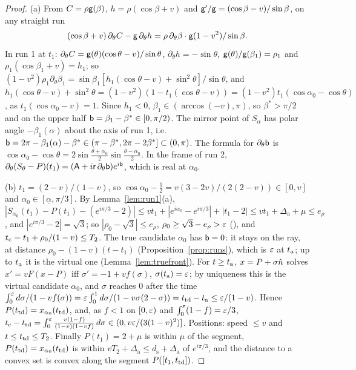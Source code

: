 \begin{proof}
(a) From $C=\rho\mathsf g(\beta)$, $h=\rho(\cos\beta+v)$ and $\mathsf g'/\mathsf g=(\cos\beta-v)/\sin\beta$, on any straight run
\[
(\cos\beta+v)\,\partial_\theta C-\mathsf g\,\partial_\theta h=\rho\,\partial_\theta\beta\cdot\mathsf g(1-v^2)/\sin\beta .
\]
In run 1 at $t_1$: $\partial_\theta C=\mathsf g(\theta)(\cos\theta-v)/\sin\theta$, $\partial_\theta h=-\sin\theta$, $\mathsf g(\theta)/\mathsf g(\beta_1)=\rho_1$ and
$\rho_1(\cos\beta_1+v)=h_1$; so $(1-v^2)\rho_1\partial_\theta\beta_1=\sin\beta_1[h_1(\cos\theta-v)+\sin^2\!\theta]/\sin\theta$, and
$h_1(\cos\theta-v)+\sin^2\!\theta=(1-v^2)(1-t_1(\cos\theta-v))=(1-v^2)t_1(\cos\alpha_0-\cos\theta)$, as $t_1(\cos\alpha_0-v)=1$. Since
$h_1<0$, $\beta_1\in(\arccos(-v),\pi)$, so $\beta^*>\pi/2$ and on the upper half $\mathsf b=\beta_1-\beta^*\in[0,\pi/2)$. The mirror point
of $S_\alpha$ has polar angle $-\beta_1(\alpha)$ about the axis of run 1, i.e.\ $\mathsf b=2\pi-\beta_1(\alpha)-\beta^*\in(\pi-\beta^*,2\pi-2\beta^*]\subset(0,\pi)$.
The formula for $\partial_\theta\mathsf b$ is $\cos\alpha_0-\cos\theta=2\sin\frac{\theta+\alpha_0}2\sin\frac{\theta-\alpha_0}2$. In the frame of run 2,
$\partial_\theta(S_\theta-P)(t_1)=(\mathsf A+i\mathsf r\,\partial_\theta\mathsf b)e^{i\mathsf b}$, which is real at $\alpha_0$.

(b) $t_1=(2-v)/(1-v)$, so $\cos\alpha_0-\frac12=v(3-2v)/(2(2-v))\in[0,v]$ and $\alpha_0\in[\underline\alpha,\pi/3]$. By Lemma~\ref{lem:run1}(a),
$|S_{\alpha_0}(t_1)-P(t_1)-(e^{i\pi/3}-2)|\le vt_1+|e^{i\alpha_0}-e^{i\pi/3}|+|t_1-2|\le vt_1+\Delta_{\mathrm a}+\mu\le e_\rho$, and
$|e^{i\pi/3}-2|=\sqrt3$; so $|\rho_0-\sqrt3|\le e_\rho$, $\rho_0\ge\sqrt3-e_\rho>\varepsilon$ (), and $t_{\mathrm c}=t_1+\rho_0/(1-v)\le T_2$.
The true candidate $\alpha_0$ has $\mathsf b=0$: it stays on the ray, at distance $\rho_0-(1-v)(t-t_1)$ (Proposition~\ref{prop:runs}), which
is $\varepsilon$ at $t_{\mathrm a}$; up to $t_{\mathrm a}$ it is the virtual one (Lemma~\ref{lem:truefront}). For $t\ge t_{\mathrm a}$, $x=P+\sigma\hat n$ solves
$x'=vF(x-P)$ iff $\sigma'=-1+vf(\sigma)$, $\sigma(t_{\mathrm a})=\varepsilon$; by uniqueness this is the virtual candidate $\alpha_0$, and $\sigma$ reaches
$0$ after the time $\int_0^\varepsilon d\sigma/(1-vf(\sigma))=\varepsilon\int_0^1d\sigma/(1-v\sigma(2-\sigma))=t_{\mathrm{td}}-t_{\mathrm a}\le\varepsilon/(1-v)$. Hence
$P(t_{\mathrm{td}})=x_{\alpha_0}(t_{\mathrm{td}})$, and, as $f<1$ on $[0,\varepsilon)$ and $\int_0^\varepsilon(1-f)=\varepsilon/3$,
$t_{\mathrm c}-t_{\mathrm{td}}=\int_0^\varepsilon\frac{v(1-f)}{(1-v)(1-vf)}\,d\sigma\in(0,v\varepsilon/(3(1-v)^2)]$. Positions: speed $\le v$ and $t\le t_{\mathrm{td}}\le T_2$. Finally
$P(t_1)=2+\mu$ is within $\mu$ of the segment, $P(t_{\mathrm{td}})=x_{\alpha_0}(t_{\mathrm{td}})$ is within $vT_2+\Delta_{\mathrm a}\le d_{\mathrm s}+\Delta_{\mathrm a}$
of $e^{i\pi/3}$, and the distance to a convex set is convex along the segment $P([t_1,t_{\mathrm{td}}])$.


\end{proof}
